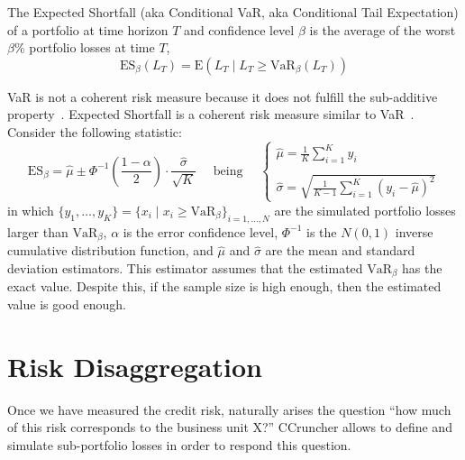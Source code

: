 \documentclass[11pt,fleqn]{book} %
\begin{document}
\begin{definition}
	The Expected Shortfall (aka Conditional VaR, aka Conditional Tail 
	Expectation) of a portfolio at time horizon $T$ and 
	confidence level $\beta$ is the average of the worst $\beta\%$ portfolio 
	losses at time $T$,
	\begin{displaymath}
		\text{ES}_\beta(L_T) = \text{E}(L_T \mid L_T \ge \text{VaR}_\beta(L_T))
	\end{displaymath}
\end{definition}

VaR is not a coherent risk measure because it does not fulfill the 
sub-additive property~\cite{var:varbad}. Expected Shortfall is a coherent 
risk measure similar to VaR~\cite{var:eshortfall}. Consider the following
statistic:
\begin{displaymath}
	\text{ES}_{\beta} = \widehat{\mu} \pm \Phi^{-1}\left(\frac{1-\alpha}{2}\right) \cdot \frac{\widehat{\sigma}}{\sqrt{K}}
	\quad \text{ being } \quad
	\left\{
	\begin{array}{l}
		\displaystyle
		\widehat{\mu} = \frac{1}{K} \sum_{i=1}^{K} y_i \\
		\\
		\displaystyle
		\widehat{\sigma} =
		\sqrt{\frac{1}{K-1} \sum_{i=1}^{K} \left( y_i - \widehat{\mu} \right)^2}
	\end{array}
	\right.
\end{displaymath}
in which 
$\{y_1, \ldots, y_K\} = \{x_i \mid x_i \ge \text{VaR}_{\beta} \}_{i=1,\dots,N}$ 
are the simulated portfolio losses larger than $\text{VaR}_{\beta}$, 
$\alpha$ is the error confidence level, $\Phi^{-1}$ is the $N(0,1)$ 
inverse cumulative distribution function, and $\widehat{\mu}$ and 
$\widehat{\sigma}$ are the mean and standard deviation estimators.
This estimator assumes that the estimated $\text{VaR}_{\beta}$ has the 
exact value. Despite this, if the sample size is high enough, then the 
estimated value is good enough.

\section{Risk Disaggregation}
\label{ss:ra}

Once we have measured the credit risk, naturally arises the question 
``how much of this risk corresponds to the business unit X?'' CCruncher
allows to define and simulate sub-portfolio losses in order to respond
this question.
\end{document}
